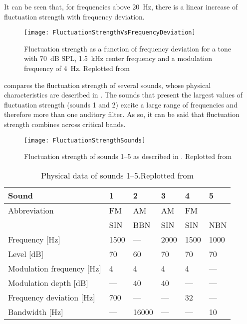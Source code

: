 \documentclass[../main.tex]{subfiles}
\begin{document}
\begin{theoreticalbackground}
It can be seen that, for frequencies above 20~Hz, there is a linear increase of
fluctuation strength with frequency deviation.

\begin{figure}[!ht]
  \centering
  \texttt{[image: FluctuationStrengthVsFrequencyDeviation]}
    \caption{Fluctuation strength as a function of frequency deviation for a
      tone with 70~dB SPL, 1.5~kHz center frequency and a modulation frequency
      of 4~Hz. Replotted from~\cite[pp. 251]{Fastl2007Psychoacoustics}}
\label{fig:flucstrenvsfreqdev}
\end{figure}

 compares the fluctuation strength of several sounds,
whose physical characteristics are described in . The
sounds that present the largest values of fluctuation strength (sounds 1 and 2)
excite a large range of frequencies and therefore more than one auditory filter.
As so, it can be said that fluctuation strength combines across critical bands.

\begin{figure}[!ht]
  \centering
  \texttt{[image: FluctuationStrengthSounds]}
  \caption{Fluctuation strength of sounds 1--5 as described in
    . Replotted from
    \cite[pp. 252]{Fastl2007Psychoacoustics}}
\label{fig:flucstrensnds}
\end{figure}

\begin{table}[!ht]
  \centering
  \begin{tabu} to \linewidth{ lXXXXX }
    \toprule
    Sound & 1 & 2 & 3 & 4 & 5 \\
    \midrule
    Abbreviation & FM & AM & AM & FM & \\
    & SIN & BBN & SIN & SIN & NBN \\
    Frequency [Hz] & 1500 & --- & 2000 & 1500 & 1000 \\
    Level [dB] & 70 & 60 & 70 & 70 & 70 \\
    Modulation frequency [Hz] & 4 & 4 & 4 & 4 & --- \\
    Modulation depth [dB] & --- & 40 & 40 & --- & --- \\
    Frequency deviation [Hz] & 700 & --- & --- & 32 & --- \\
    Bandwidth [Hz] & --- & 16000 & --- & --- & 10 \\
    \bottomrule
  \end{tabu}
  \caption{Physical data of sounds 1--5.Replotted from
  \cite[pp. 253]{Fastl2007Psychoacoustics}}
\label{tab:flucstrensnds}
\end{table}


\end{theoreticalbackground}
\end{document}
